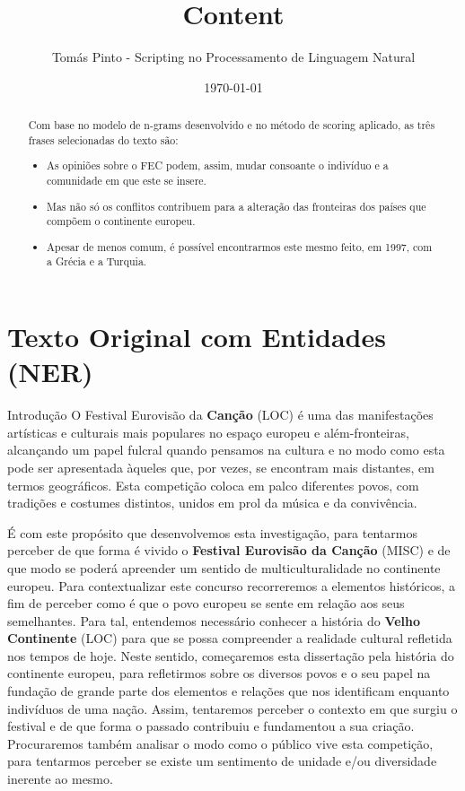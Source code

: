 \documentclass[12pt,a4paper]{article}
\title{Content}
\author{Tomás Pinto - Scripting no Processamento de Linguagem Natural}
\date{\today}
\begin{document}
\maketitle

\begin{abstract}
Com base no modelo de n-grams desenvolvido e no método de scoring aplicado, as três frases selecionadas do texto são:
\begin{itemize}
    \item As  opiniões  sobre  o  FEC  podem,  assim,  mudar  consoante  o  indivíduo  e  a comunidade em  que  este se  insere.
    \item Mas não só os conflitos contribuem para a alteração das fronteiras dos países que compõem o continente europeu.
    \item Apesar de menos comum, é possível encontrarmos este mesmo feito, em 1997, com a Grécia e a Turquia.
\end{itemize}
\end{abstract}

\section{Texto Original com Entidades (NER)}
Introdução O  Festival  Eurovisão  da  \textbf{Canção} (LOC)  é  uma  das  manifestações  artísticas  e  culturais mais populares no espaço europeu e além-fronteiras, alcançando um papel fulcral quando pensamos na cultura e no modo como esta pode ser apresentada àqueles que, por vezes, se encontram mais distantes, em termos geográficos. Esta competição coloca em palco diferentes  povos,  com  tradições  e  costumes  distintos,  unidos  em  prol  da  música  e  da convivência.

É  com  este  propósito  que  desenvolvemos  esta  investigação,  para  tentarmos perceber de que forma é vivido o \textbf{Festival Eurovisão da Canção} (MISC) e de que modo se poderá apreender um sentido de multiculturalidade no continente europeu.  Para  contextualizar este concurso recorreremos a elementos históricos, a fim de perceber como é que o povo europeu  se  sente  em  relação  aos  seus  semelhantes.  Para  tal,  entendemos  necessário conhecer  a  história  do  \textbf{Velho  Continente} (LOC)  para  que  se  possa  compreender  a  realidade cultural refletida nos tempos de hoje. Neste sentido, começaremos esta dissertação pela história do continente europeu, para refletirmos sobre os diversos povos e o seu papel na fundação  de  grande  parte  dos  elementos  e  relações  que  nos  identificam  enquanto indivíduos de uma nação. Assim, tentaremos perceber o contexto em que surgiu o festival e de que forma o passado contribuiu e fundamentou a sua criação. Procuraremos também analisar o modo como o público vive esta competição, para tentarmos perceber se existe um sentimento de unidade e/ou diversidade inerente ao mesmo.
\end{document}
